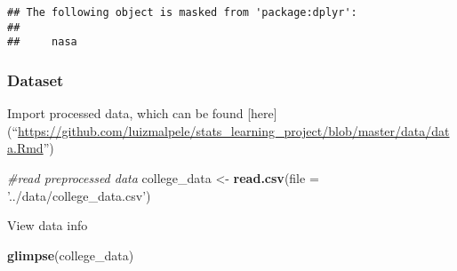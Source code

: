 \documentclass[
]{article}
\newenvironment{Shaded}{\begin{snugshade}}{\end{snugshade}}
\newcommand{\CommentTok}[1]{\textcolor[rgb]{0.56,0.35,0.01}{\textit{#1}}}
\newcommand{\DataTypeTok}[1]{\textcolor[rgb]{0.13,0.29,0.53}{#1}}
\newcommand{\KeywordTok}[1]{\textcolor[rgb]{0.13,0.29,0.53}{\textbf{#1}}}
\newcommand{\NormalTok}[1]{#1}
\newcommand{\StringTok}[1]{\textcolor[rgb]{0.31,0.60,0.02}{#1}}
\begin{document}
\begin{verbatim}
## The following object is masked from 'package:dplyr':
## 
##     nasa
\end{verbatim}

\hypertarget{dataset}{%
\subsubsection{Dataset}\label{dataset}}

Import processed data, which can be found {[}here{]}
(``\url{https://github.com/luizmalpele/stats_learning_project/blob/master/data/data.Rmd}'')

\begin{Shaded}
\begin{Highlighting}[]
\CommentTok{#read preprocessed data}
\NormalTok{college_data <-}\StringTok{ }\KeywordTok{read.csv}\NormalTok{(}\DataTypeTok{file =} \StringTok{'../data/college_data.csv'}\NormalTok{)}
\end{Highlighting}
\end{Shaded}

View data info

\begin{Shaded}
\begin{Highlighting}[]
\KeywordTok{glimpse}\NormalTok{(college_data)}
\end{Highlighting}
\end{Shaded}
\end{document}
